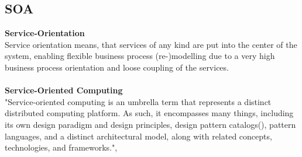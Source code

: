 \documentclass[12pt]{article}
\begin{document}
\subsection{SOA}
\textbf{Service-Orientation}\\
Service orientation means, that services of any kind are put into the center of the system, enabling flexible business process (re-)modelling due to a very high business process orientation and loose coupling of the services.\\ \\
\textbf{Service-Oriented Computing}\\
"Service-oriented computing is an umbrella term that represents a distinct distributed computing platform. As such, it encompasses many things, including its own design paradigm and design principles, design pattern catalogs(\cite{patterns}), pattern languages, and a distinct architectural model, along with related concepts, technologies, and frameworks.",\cite[page 22]{grau}\\ \\ 
\end{document}
